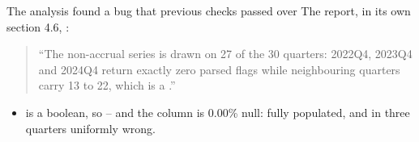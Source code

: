 \begin{frame}{The analysis found a bug that previous checks passed over}
\vs
The report, in its own section 4.6, :
\begin{quote}
``The non-accrual series is drawn on 27 of the 30 quarters: 2022Q4, 2023Q4 and
2024Q4 return exactly zero parsed flags while neighbouring quarters carry 13 to
22, which is a .''
\end{quote}
\vspace{-0.5cm}
\begin{itemize}\small
  \item {}  is a boolean, so
         -- and the column is 0.00\% null: fully
        populated, and in three quarters uniformly wrong.
\end{itemize}
\end{frame}
